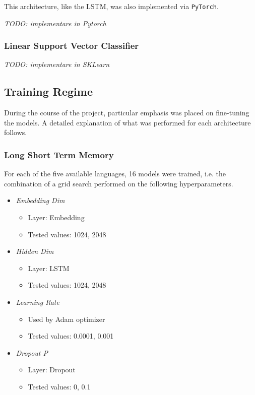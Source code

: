 \documentclass[letterpaper,11pt]{article}
\begin{document}
This architecture, like the LSTM, was also implemented via \verb|PyTorch|.

\textit{TODO: implementare in Pytorch}

\subsubsection*{Linear Support Vector Classifier}

\textit{TODO: implementare in SKLearn}

\subsection{Training Regime}
\label{subsec:fine_tuning}

During the course of the project, particular emphasis was placed on fine-tuning the models. A detailed explanation of what was performed for each architecture follows.

\subsubsection*{Long Short Term Memory}

For each of the five available languages, 16 models were trained, i.e. the combination of a grid search performed on the following hyperparameters.

\begin{itemize}
  \item \textit{Embedding Dim} 
  \begin{itemize}
    \vspace{-0.3em}
    \itemsep-0.35em
    \item Layer: Embedding
    \item Tested values: 1024, 2048 
  \end{itemize}
  \item \textit{Hidden Dim}
  \begin{itemize}
    \vspace{-0.3em}
    \itemsep-0.35em
    \item Layer: LSTM
    \item Tested values: 1024, 2048 
  \end{itemize}
  \item \textit{Learning Rate}
  \begin{itemize}
    \vspace{-0.3em}
    \itemsep-0.35em
    \item Used by Adam optimizer
    \item Tested values: 0.0001, 0.001
  \end{itemize}
  \item \textit{Dropout P}
  \begin{itemize}
    \vspace{-0.3em}
    \itemsep-0.35em
    \item Layer: Dropout
    \item Tested values: 0, 0.1 
  \end{itemize}
\end{itemize}
\end{document}
